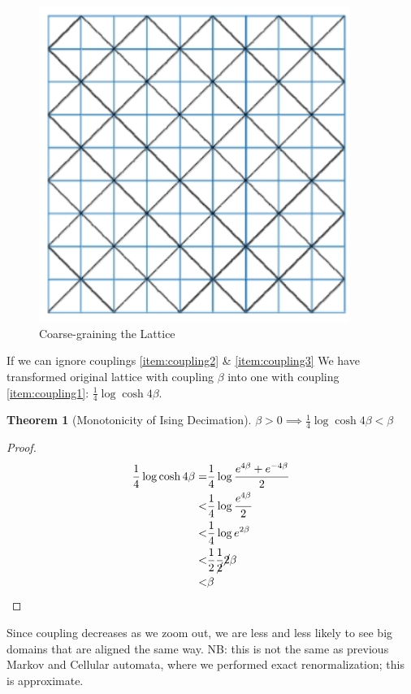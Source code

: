 \documentclass[]{article}
\newtheorem{thm}{Theorem}
\begin{document}
\begin{figure}[H]
	\caption{Coarse-graining the Lattice}\label{fig:ising-decimation}
	\includegraphics[width=0.9\textwidth]{isinng-decimation}
\end{figure}

If we can ignore couplings \ref{item:coupling2} \& \ref{item:coupling3} We have transformed original lattice with coupling $\beta$ into one with coupling \ref{item:coupling1}: $\frac{1}{4} \log{\cosh{4\beta}}$.

\begin{thm}[Monotonicity of Ising Decimation]
	$\beta > 0 \implies \frac{1}{4} \log{\cosh{4\beta}} < \beta$
\end{thm}

\begin{proof}
	\begin{align*}
	\frac{1}{4} \log{\cosh{4\beta}} =& \frac{1}{4} \log{\frac{e^{4\beta} + e^{- 4 \beta}}{2}}\\
	<&  \frac{1}{4} \log{\frac{e^{4\beta} }{2}}\\
	<& \frac{1}{4} \log{e^{2\beta} } \\
	<& \frac{1}{2} \frac{1}{\cancel{2}} \cancel{2} \beta\\
	<& \beta
	\end{align*}
\end{proof}

Since coupling decreases as we zoom out, we are less and less likely to see big domains that are aligned the same way. NB: this is not the same as previous Markov and Cellular automata, where we performed exact renormalization; this is approximate.
\end{document}
